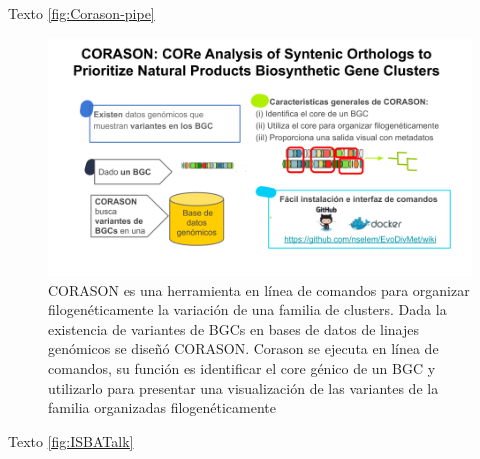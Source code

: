 \documentclass[12pt,twoside]{reedthesis}
\begin{document}
  Texto \autoref{fig:Corason-pipe}
  
  \begin{figure}[h!tbp]
  \centering
  \includegraphics[angle = 0,scale = .4]{chapter3/ISBATalk.png}
  \caption[ CORASON es una herramienta en línea de comandos para organizar filogenéticamente la variación de una familia de clusters. ]{\footnotesize{CORASON es una herramienta en línea de comandos para organizar filogenéticamente la variación de una familia de clusters. Dada la existencia de variantes de BGCs en bases de datos  de linajes genómicos se diseñó CORASON. Corason se ejecuta en línea de comandos, su función es identificar el core génico de un BGC y utilizarlo para presentar una visualización de las variantes de la familia organizadas filogenéticamente}}
  \label{fig:ISBATalk}
  \end{figure}
  
  Texto \autoref{fig:ISBATalk}
  
\end{document}

